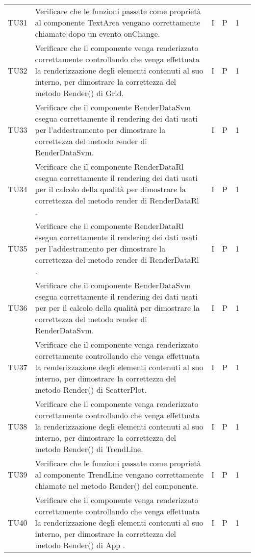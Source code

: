 \begin{longtable} {
		>{}p{12mm}
		>{}p{79.5mm}
		>{}p{9mm}
		>{}p{8mm}
		>{}p{14mm}
		>{}p{0mm}}
	TU31		& Verificare che le funzioni passate come proprietà al componente TextArea vengano correttamente chiamate dopo un evento onChange. & I & P & 1 & \TBstrut \\ [2mm]
	TU32		& Verificare che il componente venga renderizzato correttamente controllando che venga effettuata la renderizzazione degli elementi contenuti al suo interno, per dimostrare la correttezza del metodo Render() di Grid. & I & P & 1 & \TBstrut \\ [2mm]
	TU33		& Verificare che il componente RenderDataSvm esegua correttamente il rendering dei dati usati per l'addestramento per dimostrare la correttezza del metodo render di RenderDataSvm. & I & P & 1 & \TBstrut \\ [2mm]
	TU34		& Verificare che il componente RenderDataRl esegua correttamente il rendering dei dati usati per il calcolo della qualità per dimostrare la correttezza del metodo render di RenderDataRl . & I & P & 1 & \TBstrut \\ [2mm]
	TU35		& Verificare che il componente RenderDataRl esegua correttamente il rendering dei dati usati per l'addestramento per dimostrare la correttezza del metodo render di RenderDataRl . & I & P & 1 & \TBstrut \\ [2mm]
	TU36		& Verificare che il componente RenderDataSvm esegua correttamente il rendering dei dati usati per per il calcolo della qualità per dimostrare la correttezza del metodo render di RenderDataSvm. & I & P & 1 & \TBstrut \\ [2mm]
	TU37		& Verificare che il componente venga renderizzato correttamente controllando che venga effettuata la renderizzazione degli elementi contenuti al suo interno, per dimostrare la correttezza del metodo Render() di ScatterPlot. & I & P & 1 & \TBstrut \\ [2mm]
	TU38		& Verificare che il componente venga renderizzato correttamente controllando che venga effettuata la renderizzazione degli elementi contenuti al suo interno, per dimostrare la correttezza del metodo Render() di TrendLine. & I & P & 1 & \TBstrut \\ [2mm]
	TU39		& Verificare che le funzioni passate come proprietà al componente TrendLine vengano correttamente chiamate nel metodo Render() del componente. & I & P & 1 & \TBstrut \\ [2mm]
	TU40		& Verificare che il componente venga renderizzato correttamente controllando che venga effettuata la renderizzazione degli elementi contenuti al suo interno, per dimostrare la correttezza del metodo Render() di App . & I & P & 1 & \TBstrut \\ [2mm]
	

\end{longtable}
